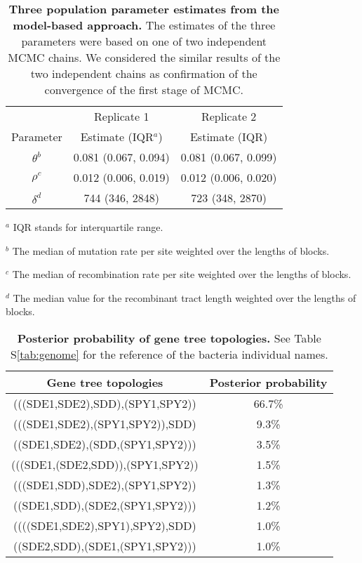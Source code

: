 \documentclass[10pt]{article}
\providecommand{\tabularnewline}{\\}
\begin{document}
\begin{table}[!ht]
\caption{
{\bf Three population parameter estimates from the model-based approach.}
The estimates of the three parameters were based on one of two independent
MCMC chains.  We considered the similar 
results of the two independent chains as confirmation of 
the convergence of the first stage of MCMC.}
\noindent \begin{centering}
\begin{tabular}{ccc}
\hline
& Replicate 1 & Replicate 2\tabularnewline
Parameter & Estimate (IQR$^a$) & Estimate (IQR)\tabularnewline
\hline
$\theta^b$ & 0.081 (0.067, 0.094) & 0.081 (0.067, 0.099)\tabularnewline
$\rho^c$ & 0.012 (0.006, 0.019) & 0.012 (0.006, 0.020)\tabularnewline
$\delta^d$ & 744 (346, 2848) & 723 (348, 2870)\tabularnewline
\hline
\end{tabular}
\par\end{centering}
\begin{flushleft}
$^a$ IQR stands for interquartile range.

$^b$ The median of mutation rate per site weighted over the lengths of blocks. 

$^c$ The median of recombination rate per site weighted over the lengths of blocks.

$^d$ The median value for the recombinant tract length weighted over the lengths of blocks.
\end{flushleft}
\label{tab:three}
\end{table}

\begin{table}[!ht]
\caption{
{\bf Posterior probability of gene tree topologies.}
See Table S\ref{tab:genome} for the reference of the bacteria
individual names.}
\noindent \begin{centering}
\begin{tabular}{cc}
\hline 
Gene tree topologies & Posterior probability\tabularnewline
\hline
(((SDE1,SDE2),SDD),(SPY1,SPY2)) & 66.7\%\tabularnewline
(((SDE1,SDE2),(SPY1,SPY2)),SDD) & 9.3\%\tabularnewline
((SDE1,SDE2),(SDD,(SPY1,SPY2))) & 3.5\%\tabularnewline
(((SDE1,(SDE2,SDD)),(SPY1,SPY2)) & 1.5\%\tabularnewline
(((SDE1,SDD),SDE2),(SPY1,SPY2)) & 1.3\%\tabularnewline
((SDE1,SDD),(SDE2,(SPY1,SPY2))) & 1.2\%\tabularnewline
((((SDE1,SDE2),SPY1),SPY2),SDD) & 1.0\%\tabularnewline
((SDE2,SDD),(SDE1,(SPY1,SPY2))) & 1.0\%\tabularnewline
\hline
\end{tabular}
\par\end{centering}
\label{tab:Gene-tree-topologies}
\end{table}
\end{document}
